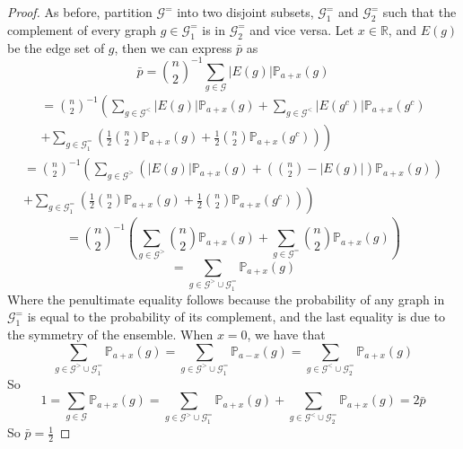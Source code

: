 \documentclass{article}
\begin{document}
\begin{proof}
    As before, partition $\mathcal{G}^=$ into two disjoint subsets, $\mathcal{G}_1^=$ and $\mathcal{G}_2^=$ such that the complement of every graph $g \in \mathcal{G}_1^=$ is in $\mathcal{G}_2^=$ and vice versa. Let $x \in \mathbb{R}$, and $E(g)$ be the edge set of $g$, then we can express $\bar{p}$ as
    \begin{equation}
        \bar{p} = \binom{n}{2}^{-1}\sum_{g \in \mathcal{G}} |E(g)|\mathbb{P}_{a+x}(g)
    \end{equation}
    \begin{gather}
        = \binom{n}{2}^{-1}\left(\sum_{g \in \mathcal{G}^<}|E(g)|\mathbb{P}_{a+x}(g) + \sum_{g \in \mathcal{G}^<}|E(g^c)|\mathbb{P}_{a+x}(g^c) \right. \nonumber \\
        + \left. \sum_{g \in \mathcal{G}_1^=} \left(\frac{1}{2}\binom{n}{2} \mathbb{P}_{a+x}(g) + \frac{1}{2}\binom{n}{2} \mathbb{P}_{a+x}(g^c)\right)\right)
    \end{gather}
    \begin{gather}
        = \binom{n}{2}^{-1}\left(\sum_{g \in \mathcal{G}^>}(|E(g)|\mathbb{P}_{a+x}(g) + \left(\binom{n}{2}-|E(g)|\right)\mathbb{P}_{a+x}(g)) \right. \nonumber \\
        + \left. \sum_{g \in \mathcal{G}_1^=} \left(\frac{1}{2}\binom{n}{2} \mathbb{P}_{a+x}(g) + \frac{1}{2}\binom{n}{2} \mathbb{P}_{a+x}(g^c)\right) \right)
    \end{gather}
    \begin{equation}
        =  \binom{n}{2}^{-1}\left(\sum_{g \in \mathcal{G}^>}\binom{n}{2}\mathbb{P}_{a+x}(g) + \sum_{g\in\mathcal{G}^=}\binom{n}{2}\mathbb{P}_{a+x}(g)\right)
    \end{equation}
    \begin{equation}
        = \sum_{g\in\mathcal{G}^> \cup \mathcal{G}_1^=} \mathbb{P}_{a+x}(g)
    \end{equation}
    Where the penultimate equality follows because the probability of any graph in $\mathcal{G}_1^=$ is equal to the probability of its complement, and the last equality is due to the symmetry of the ensemble. When $x=0$, we have that 
    \begin{equation}
        \sum_{g\in\mathcal{G}^>\cup \mathcal{G}_1^=} \mathbb{P}_{a+x}(g) = \sum_{g\in\mathcal{G}^>\cup \mathcal{G}_1^=} \mathbb{P}_{a-x}(g) = \sum_{g\in\mathcal{G}^<\cup \mathcal{G}_2^=} \mathbb{P}_{a+x}(g)
    \end{equation}
    So
    \begin{equation}
    1 = \sum_{g \in \mathcal{G}} \mathbb{P}_{a+x}(g) = \sum_{g\in\mathcal{G}^>\cup \mathcal{G}_1^=} \mathbb{P}_{a+x}(g) + \sum_{g\in\mathcal{G}^<\cup \mathcal{G}_2^=} \mathbb{P}_{a+x}(g) = 2\bar{p}
    \end{equation}
    So $\bar{p}=\frac{1}{2}$
\end{proof}
\end{document}
